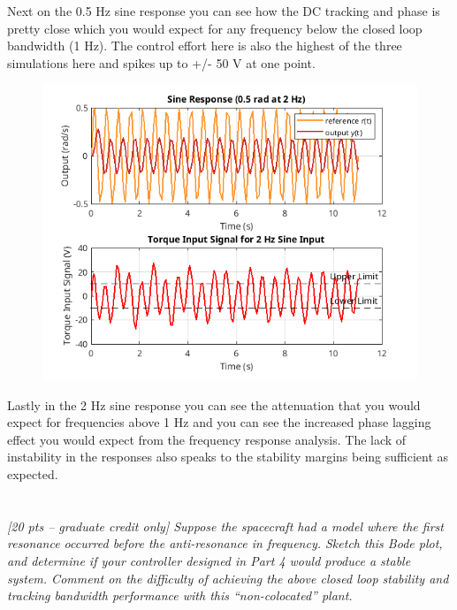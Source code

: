 \documentclass{article}
\begin{document}
Next on the 0.5 Hz sine response you can see how the DC tracking and phase is pretty close which you would expect for any frequency below the closed loop bandwidth (1 Hz).
The control effort here is also the highest of the three simulations here and spikes up to +/- 50 V at one point.

\begin{figure}[H]
    \centering
    \includegraphics[width=\textwidth]{twoSineResponse.png}
    \label{fig:twoSineResponse}
\end{figure}

Lastly in the 2 Hz sine response you can see the attenuation that you would expect for frequencies above 1 Hz and you can see the increased phase lagging effect you would expect from the frequency response analysis.
The lack of instability in the responses also speaks to the stability margins being sufficient as expected.

\section{}

\textit{[20 pts – graduate credit only] Suppose the spacecraft had a model where the first resonance occurred before the anti-resonance in frequency. Sketch this Bode plot, and determine if your controller designed in Part 4 would produce a stable system. Comment on the difficulty of achieving the above closed loop stability and tracking bandwidth performance with this “non-colocated” plant.}
\end{document}
